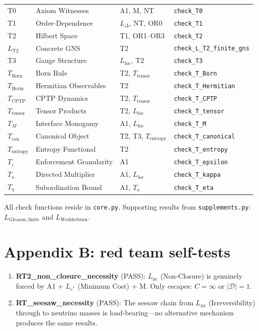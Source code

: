 \documentclass[11pt]{article}
\begin{document}
\begin{center}
\begin{tabular}{lp{4.5cm}p{3.8cm}l}
T0 & Axiom Witnesses & A1, M, NT & \texttt{check\_T0} \\
T1 & Order-Dependence & $L_\Delta$, NT, OR0 & \texttt{check\_T1} \\
T2 & Hilbert Space & T1, OR1--OR3 & \texttt{check\_T2} \\
$L_{\mathrm{T2}}$ & Concrete GNS & T2 & \texttt{check\_L\_T2\_finite\_gns} \\
T3 & Gauge Structure & $L_{\mathrm{loc}}$, T2 & \texttt{check\_T3} \\
$T_{\mathrm{Born}}$ & Born Rule & T2, $T_{\mathrm{tensor}}$ & \texttt{check\_T\_Born} \\
$T_{\mathrm{Herm}}$ & Hermitian Observables & T2 & \texttt{check\_T\_Hermitian} \\
$T_{\mathrm{CPTP}}$ & CPTP Dynamics & T2, $T_{\mathrm{tensor}}$ & \texttt{check\_T\_CPTP} \\
$T_{\mathrm{tensor}}$ & Tensor Products & T2, $L_{\mathrm{loc}}$ & \texttt{check\_T\_tensor} \\
$T_M$ & Interface Monogamy & A1, $L_{\mathrm{loc}}$ & \texttt{check\_T\_M} \\
$T_{\mathrm{can}}$ & Canonical Object & T2, T3, $T_{\mathrm{entropy}}$ & \texttt{check\_T\_canonical} \\
$T_{\mathrm{entropy}}$ & Entropy Functional & T2 & \texttt{check\_T\_entropy} \\
$T_\varepsilon$ & Enforcement Granularity & A1 & \texttt{check\_T\_epsilon} \\
$T_\kappa$ & Directed Multiplier & A1, $L_{\mathrm{loc}}$ & \texttt{check\_T\_kappa} \\
$T_\eta$ & Subordination Bound & A1, $T_\kappa$ & \texttt{check\_T\_eta} \\
\bottomrule
\end{tabular}
\end{center}

All check functions reside in \texttt{core.py}.  Supporting results from \texttt{supplements.py}: $L_{\mathrm{Gleason,finite}}$ and $L_{\mathrm{Wedderburn}}$.


\section{Appendix B: red team self-tests}

\begin{enumerate}
  \item \textbf{RT2\_non\_closure\_necessity} (PASS):  $L_{\mathrm{nc}}$ (Non-Closure) is genuinely forced by A1 + $L_{\varepsilon^*}$ (Minimum Cost) + M.  Only escapes: $C = \infty$ or $|\mathcal{D}| = 1$.

  \item \textbf{RT\_seesaw\_necessity} (PASS):  The seesaw chain from $L_{\mathrm{irr}}$ (Irreversibility) through to neutrino masses is load-bearing---no alternative mechanism produces the same results.
\end{enumerate}
\end{document}
